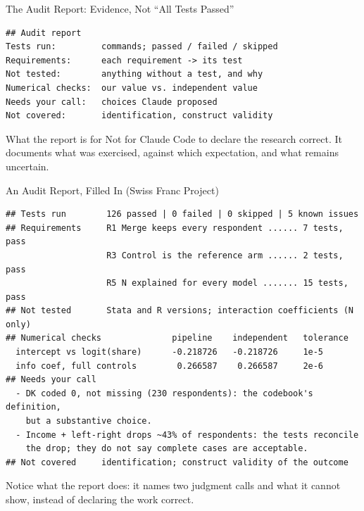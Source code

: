 \documentclass[aspectratio=169, 11pt]{beamer}
\begin{document}
\begin{frame}[fragile]{The Audit Report: Evidence, Not ``All Tests Passed''}
  \begin{lstlisting}[basicstyle=\ttfamily\footnotesize]
## Audit report
Tests run:         commands; passed / failed / skipped
Requirements:      each requirement -> its test
Not tested:        anything without a test, and why
Numerical checks:  our value vs. independent value
Needs your call:   choices Claude proposed
Not covered:       identification, construct validity
  \end{lstlisting}

  \vspace{0.3em}
  \begin{block}{What the report is for}
    Not for Claude Code to declare the research correct. It documents what was exercised, against which expectation, and what remains uncertain.
  \end{block}
\end{frame}

\begin{frame}[fragile]{An Audit Report, Filled In (Swiss Franc Project)}
  \begin{lstlisting}[basicstyle=\ttfamily\scriptsize, columns=fixed, keepspaces=true]
## Tests run        126 passed | 0 failed | 0 skipped | 5 known issues
## Requirements     R1 Merge keeps every respondent ...... 7 tests, pass
                    R3 Control is the reference arm ...... 2 tests, pass
                    R5 N explained for every model ....... 15 tests, pass
## Not tested       Stata and R versions; interaction coefficients (N only)
## Numerical checks              pipeline    independent   tolerance
  intercept vs logit(share)      -0.218726   -0.218726     1e-5
  info coef, full controls        0.266587    0.266587     2e-6
## Needs your call
  - DK coded 0, not missing (230 respondents): the codebook's definition,
    but a substantive choice.
  - Income + left-right drops ~43% of respondents: the tests reconcile
    the drop; they do not say complete cases are acceptable.
## Not covered     identification; construct validity of the outcome
  \end{lstlisting}

  \vspace{0.3em}
  {\small Notice what the report does: it names two judgment calls and what it cannot show, instead of declaring the work correct.}
\end{frame}
\end{document}
